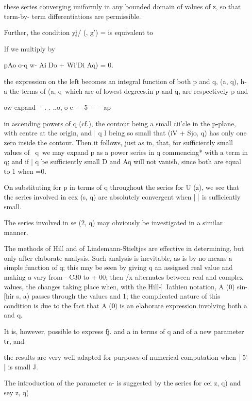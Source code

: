 {{these series converging uniformly in any bounded domain of values of
z, so that term-by- term differentiations are permissible.

Further, the condition yj/ (, g') = is equivalent to

If we multiply by

pAo o-q w- Ai Do + Wi'Di Aq) = 0.

%
%

the expression on the left becomes an integral function of both p and
q, (a, q), h-a\; the terms of (a, q\ which are of lowest degrees.in p
and q, are respectively p and

 ow expand - -. . ..o, o c - - 5 - - - ap

in ascending powers of q (cf.), the contour being a small
cii'cle in the p-plane, with centre at the origin, and | q I being so
small that (iV + Sjo, q) has only one zero inside the contour. Then it
follows, just as in, that, for sufficiently small values of \
q\, we may expand p as a power series in q commencing* with a term in
q; and if | q be sufficiently small D and Aq will not vanish, since
both are equal to 1 when =0.

On substituting for p in terms of q throughout the series for U (z),
we see that the series involved in cex (s, q) are absolutely
convergent when | | is sufficiently small.

The series involved in se (2, q) may obviously be investigated in a
similar manner.


The methods of Hill and of Lindemann-Stieltjes are effective in
determining, but only after elaborate analysis. Such analysis is
inevitable, as is by no means a simple function of q; this may be
seen by giving q an assigned real value and making a vary from - C30
to + 00; then /x alternates between real and complex values, the
changes taking place when, with the Hill-]\ Iathieu notation, A (0)
sin- [hir s, a) passes through the values and 1; the complicated
nature of this condition is due to the fact that A (0) is an elaborate
expression involving both a and q.

It is, however, possible to express fj. and a in terms of q and of a
new parameter tr, and

the results are very well adapted for purposes of numerical
computation when | 5' | is small J.

The introduction of the parameter a- is suggested by the series for
cei z, q) and sey z, q)

}}
